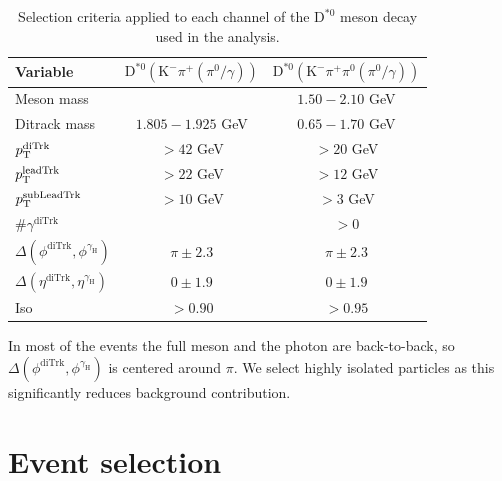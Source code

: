 \begin{table}[!ht]
    \centering
    \begin{tabular}{|l|c|c|}
        \hline
        \cellcolor{lightgray}Variable & \cellcolor{lightgray}$\text{D}^{*0}(\text{K}^{-}\pi^{+}{\scriptstyle(\pi^{0}/\gamma)})$ & \cellcolor{lightgray}$\text{D}^{*0}(\text{K}^{-}\pi^{+}\pi^{0}{\scriptstyle(\pi^{0}/\gamma)})$ \\ \hline
        Meson mass                                              &                   &$1.50-2.10$ GeV  \\
        Ditrack mass                                            &$1.805-1.925$ GeV  &$0.65-1.70$ GeV  \\
        $p_\text{T}^{\text{diTrk}}$                                    &$>42$ GeV          &$>20$ GeV           \\
        $p_\text{T}^{\text{leadTrk}}$                                  &$>22$ GeV          &$>12$ GeV           \\
        $p_\text{T}^{\text{subLeadTrk}}$                               &$>10$ GeV          &$>3$ GeV           \\
        $\#\gamma^{\text{diTrk}}$                               &                   &$>0$               \\
        $\Delta(\phi^{\text{diTrk}}, \phi^{\gamma_\text{H}})$   &$\pi\pm2.3$        &$\pi\pm2.3$        \\
        $\Delta(\eta^{\text{diTrk}}, \eta^{\gamma_\text{H}})$   &$0\pm1.9$          &$0\pm1.9$           \\
        Iso                                                     &$>0.90$            &$>0.95$             \\
        \hline
        \end{tabular}
    \caption{Selection criteria applied to each channel of the $\text{D}^{*0}$ meson decay used in the analysis.}
    \label{tab:meson_selection_2}
\end{table}

In most of the events the full meson and the photon are back-to-back, so $\Delta(\phi^{\text{diTrk}}, \phi^{\gamma_\text{H}})$ is centered around $\pi$. We select highly isolated particles as this significantly reduces background contribution.

\section{Event selection}\label{sec:event_selection}

